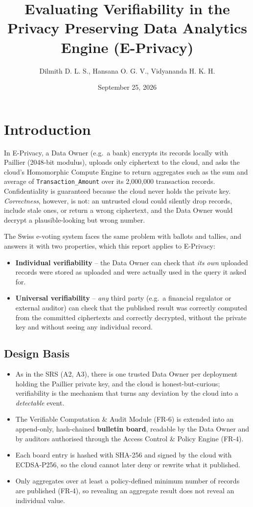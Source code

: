 \documentclass[12pt]{article}
\title{Evaluating Verifiability in the Privacy Preserving Data Analytics Engine (E-Privacy)}
\author{Dilmith D. L. S., Hansana O. G. V., Vidyananda H. K. H.}
\date{September 25, 2026}
\begin{document}
\maketitle

\section{Introduction}
In E-Privacy, a Data Owner (e.g.\ a bank) encrypts its records locally with Paillier (2048-bit modulus), uploads only ciphertext to the cloud, and asks the cloud's Homomorphic Compute Engine to return aggregates such as the sum and average of \texttt{Transaction\_Amount} over its 2,000,000 transaction records. Confidentiality is guaranteed because the cloud never holds the private key. \emph{Correctness}, however, is not: an untrusted cloud could silently drop records, include stale ones, or return a wrong ciphertext, and the Data Owner would decrypt a plausible-looking but wrong number.

The Swiss e-voting system faces the same problem with ballots and tallies, and answers it with two properties, which this report applies to E-Privacy:
\begin{itemize}[leftmargin=1.5em]
    \item \textbf{Individual verifiability} -- the Data Owner can check that \emph{its own} uploaded records were stored as uploaded and were actually used in the query it asked for.
    \item \textbf{Universal verifiability} -- \emph{any} third party (e.g.\ a financial regulator or external auditor) can check that the published result was correctly computed from the committed ciphertexts and correctly decrypted, without the private key and without seeing any individual record.
\end{itemize}

\subsection{Design Basis}
\begin{itemize}[leftmargin=1.5em]
    \item[V1.] As in the SRS (A2, A3), there is one trusted Data Owner per deployment holding the Paillier private key, and the cloud is honest-but-curious; verifiability is the mechanism that turns any deviation by the cloud into a \emph{detectable} event.
    \item[V2.] The Verifiable Computation \& Audit Module (FR-6) is extended into an append-only, hash-chained \textbf{bulletin board}, readable by the Data Owner and by auditors authorised through the Access Control \& Policy Engine (FR-4).
    \item[V3.] Each board entry is hashed with SHA-256 and signed by the cloud with ECDSA-P256, so the cloud cannot later deny or rewrite what it published.
    \item[V4.] Only aggregates over at least a policy-defined minimum number of records are published (FR-4), so revealing an aggregate result does not reveal an individual value.
\end{itemize}
\end{document}
